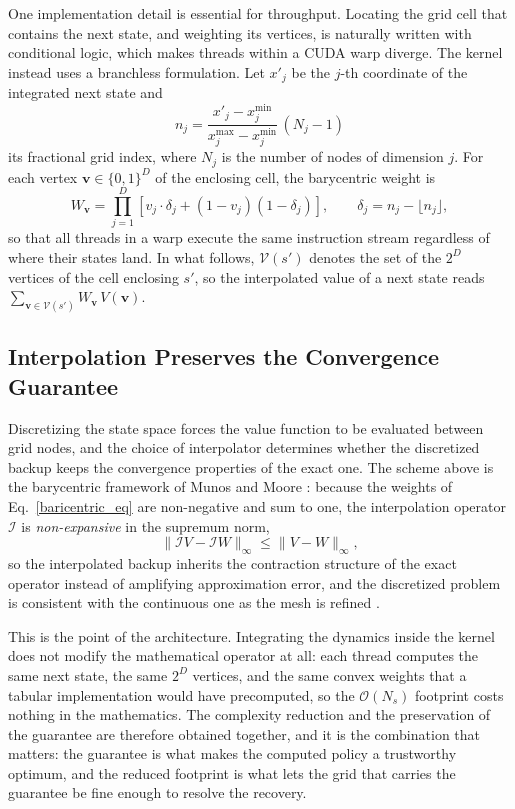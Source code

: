 \documentclass[journal ]{new-aiaa}
\begin{document}
One implementation detail is essential for throughput. Locating the grid cell that contains the next state, and weighting its vertices, is naturally written with conditional logic, which makes threads within a CUDA warp diverge. The kernel instead uses a branchless formulation. Let $x'_j$ be the $j$-th coordinate of the integrated next state and
\begin{equation}
    n_j = \frac{x'_j - x_j^{\min}}{x_j^{\max} - x_j^{\min}} \, (N_j - 1)
\end{equation}
its fractional grid index, where $N_j$ is the number of nodes of dimension $j$. For each vertex $\mathbf{v} \in \{0, 1\}^D$ of the enclosing cell, the barycentric weight is
\begin{equation}
    W_{\mathbf{v}} = \prod_{j=1}^{D} \left[ v_j \cdot \delta_j + (1 - v_j)(1 - \delta_j) \right],
    \qquad \delta_j = n_j - \lfloor n_j \rfloor,
    \label{baricentric_eq}
\end{equation}
so that all threads in a warp execute the same instruction stream regardless of where their states land. In what follows, $\mathcal{V}(s')$ denotes the set of the $2^D$ vertices of the cell enclosing $s'$, so the interpolated value of a next state reads $\sum_{\mathbf{v} \in \mathcal{V}(s')} W_{\mathbf{v}}\, V(\mathbf{v})$.

\subsection{Interpolation Preserves the Convergence Guarantee}
\label{sec:guarantee}
Discretizing the state space forces the value function to be evaluated between grid nodes, and the choice of interpolator determines whether the discretized backup keeps the convergence properties of the exact one. The scheme above is the barycentric framework of Munos and Moore \cite{Munos1998}: because the weights of Eq.~\eqref{baricentric_eq} are non-negative and sum to one, the interpolation operator $\mathcal{I}$ is \emph{non-expansive} in the supremum norm,
\begin{equation*}
    \|\mathcal{I}V - \mathcal{I}W\|_\infty \le \|V - W\|_\infty ,
\end{equation*}
so the interpolated backup inherits the contraction structure of the exact operator instead of amplifying approximation error, and the discretized problem is consistent with the continuous one as the mesh is refined \cite{Munos1998, Munos2002}.

This is the point of the architecture. Integrating the dynamics inside the kernel does not modify the mathematical operator at all: each thread computes the same next state, the same $2^D$ vertices, and the same convex weights that a tabular implementation would have precomputed, so the $\mathcal{O}(N_s)$ footprint costs nothing in the mathematics. The complexity reduction and the preservation of the guarantee are therefore obtained together, and it is the combination that matters: the guarantee is what makes the computed policy a trustworthy optimum, and the reduced footprint is what lets the grid that carries the guarantee be fine enough to resolve the recovery.
\end{document}
